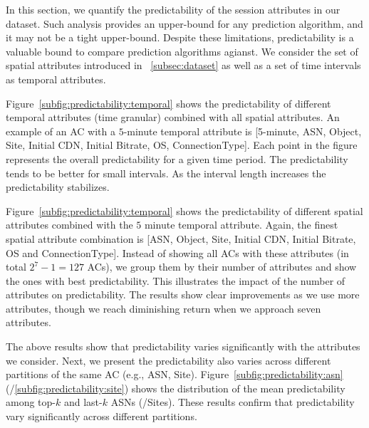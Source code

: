 In this section, we quantify the predictability of the session attributes in our dataset. Such analysis provides an upper-bound for any prediction algorithm, and it may not be a tight upper-bound. Despite these limitations, predictability is a valuable bound to compare prediction algorithms agianst. We consider the set of spatial attributes introduced in \Section~\ref{subsec:dataset} as well as a set of time intervals as temporal attributes.

 Figure~\ref{subfig:predictability:temporal} shows the predictability of different temporal attributes (time granular) combined with all spatial attributes. An example of an AC with a $5$-minute temporal attribute is [5-minute, ASN, Object, Site, Initial CDN, Initial Bitrate, OS, ConnectionType]. Each point in the figure represents the overall predictability for a given time period. The predictability tends to be better for small intervals. As the interval length increases the predictability stabilizes.

 Figure~\ref{subfig:predictability:temporal} shows the predictability of different spatial attributes combined with the $5$ minute temporal attribute. Again, the finest spatial attribute combination is [ASN, Object, Site, Initial CDN, Initial Bitrate, OS and ConnectionType].  Instead of showing all ACs with these attributes (in total $2^7-1=127$ ACs), we group them by their number of attributes and show the ones with best predictability. This illustrates the impact of the number of attributes on predictability. The results show clear improvements as we use more attributes, though we reach diminishing return when we approach seven attributes.

 The above results show that predictability varies significantly with the attributes we consider. Next, we present the predictability also varies across different partitions of the same AC (e.g., ASN, Site). Figure~\ref{subfig:predictability:asn} (/\ref{subfig:predictability:site}) shows the distribution of the mean predictability among top-$k$ and last-$k$ ASNs (/Sites). These results confirm that predictability vary significantly across different partitions. 



